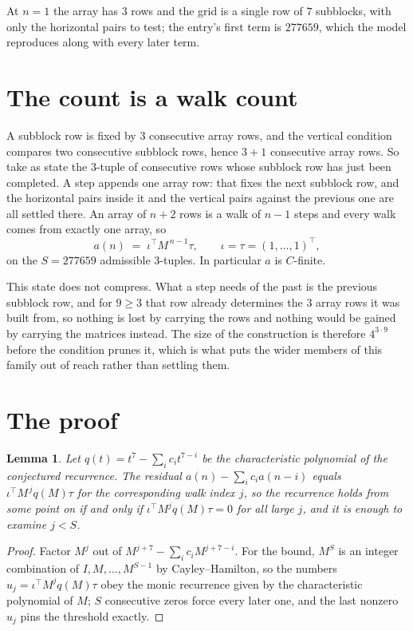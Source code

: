 \documentclass[11pt,a4paper]{article}
\theoremstyle{plain}
\newtheorem{lemma}[theorem]{Lemma}
\theoremstyle{definition}
\begin{document}
At $n=1$ the array has $3$ rows and the grid is a single row of $7$
subblocks, with only the horizontal pairs to test; the entry's first term is
$277659$, which the model reproduces along with every later term.

\section{The count is a walk count}

A subblock row is fixed by $3$ consecutive array rows, and the vertical condition compares
two consecutive subblock rows, hence $3+1$ consecutive array rows. So take as state the
$3$-tuple of consecutive rows whose subblock row has just been completed. A step appends one
array row: that fixes the next subblock row, and the horizontal pairs inside it and the
vertical pairs against the previous one are all settled there. An array of $n+2$ rows is
a walk of $n-1$ steps and every walk comes from exactly one array, so
\[
a(n)\;=\;\iota^{\!\top}M^{\,n-1}\tau,\qquad\iota=\tau=(1,\dots,1)^{\!\top},
\]
on the $S=277659$ admissible $3$-tuples. In particular $a$ is $C$-finite.

This state does not compress. What a step needs of the past is the previous subblock row, and
for $9\ge3$ that row already determines the $3$ array rows it was built from, so nothing
is lost by carrying the rows and nothing would be gained by carrying the matrices instead. The
size of the construction is therefore $4^{3\cdot9}$ before the condition prunes
it, which is what puts the wider members of this family out of reach rather than settling them.

\section{The proof}

\begin{lemma}\label{lem:crit}
Let $q(t)=t^{7}-\sum_i c_it^{7-i}$ be the characteristic polynomial of the
conjectured recurrence. The residual $a(n)-\sum_ic_ia(n-i)$ equals
$\iota^{\!\top}M^{\,j}q(M)\tau$ for the corresponding walk index $j$, so the recurrence
holds from some point on if and only if $\iota^{\!\top}M^{j}q(M)\tau=0$ for all large $j$,
and it is enough to examine $j<S$.
\end{lemma}

\begin{proof}
Factor $M^{j}$ out of $M^{j+7}-\sum_ic_iM^{j+7-i}$. For the bound, $M^{S}$
is an integer combination of $I,M,\dots,M^{S-1}$ by Cayley--Hamilton, so the numbers
$u_j=\iota^{\!\top}M^{j}q(M)\tau$ obey the monic recurrence given by the characteristic
polynomial of $M$; $S$ consecutive zeros force every later one, and the last nonzero $u_j$
pins the threshold exactly.
\end{proof}
\end{document}
